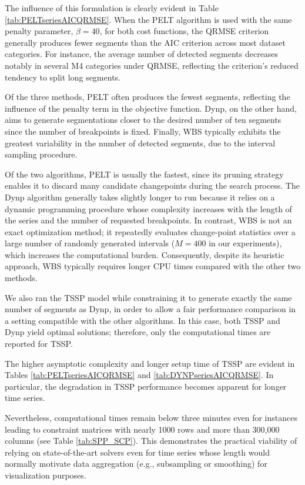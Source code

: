 \documentclass[preprints,article,submit,pdftex,moreauthors]{Definitions/mdpi}
\begin{document}
The influence of this formulation is clearly evident in Table \ref{tab:PELTseriesAICQRMSE}. When the PELT algorithm is used with the same penalty parameter, $\beta = 40$, for both cost functions, the QRMSE criterion generally produces fewer segments than the AIC criterion across most dataset categories. 
For instance, the average number of detected segments decreases notably in several M4 categories under QRMSE, reflecting the criterion's reduced tendency to split long segments.

Of the three methods, PELT often produces the fewest segments, reflecting the influence of the penalty term in the objective function. 
Dynp, on the other hand, aims to generate segmentations closer to the desired number of ten segments since the number of breakpoints is fixed. Finally, WBS typically exhibits the greatest variability in the number of detected segments, due to the interval sampling procedure. 

Of the two algorithms, PELT is usually the fastest, since its pruning strategy enables it to discard many candidate changepoints during the search process.
The Dynp algorithm generally takes slightly longer to run because it relies on a dynamic programming procedure whose complexity increases with the length of the series and the number of requested breakpoints. 
In contrast, WBS is not an exact optimization method; it repeatedly evaluates change-point statistics over a large number of randomly generated intervals ($M = 400$ in our experiments), which increases the computational burden. 
Consequently, despite its heuristic approach, WBS typically requires longer CPU times compared with the other two methods.

We also ran the TSSP model while constraining it to generate exactly the same number of segments as Dynp, in order to allow a fair performance comparison in a setting compatible with the other algorithms. In this case, both TSSP and Dynp yield optimal solutions; therefore, only the computational times are reported for TSSP.

The higher asymptotic complexity and longer setup time of TSSP are evident in Tables \ref{tab:PELTseriesAICQRMSE} and \ref{tab:DYNPseriesAICQRMSE}. In particular, the degradation in TSSP performance becomes apparent for longer time series.

Nevertheless, computational times remain below three minutes even for instances leading to constraint matrices with nearly 1000 rows and more than 300,000 columns (see Table \ref{tab:SPP_SCP}). This demonstrates the practical viability of relying on state-of-the-art solvers even for time series whose length would normally motivate data aggregation (e.g., subsampling or smoothing) for visualization purposes.
\end{document}
